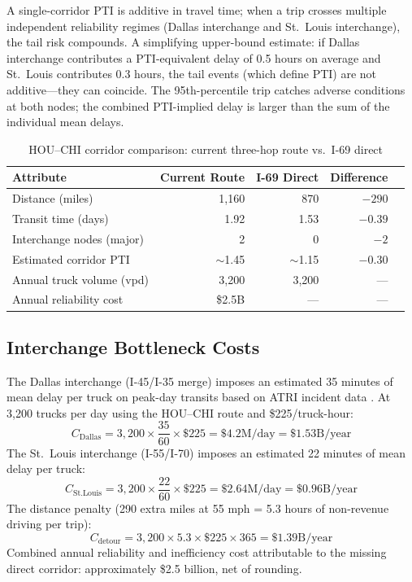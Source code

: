 A single-corridor PTI is additive in travel time; when a trip crosses multiple independent reliability regimes (Dallas interchange and St.\ Louis interchange), the tail risk compounds. A simplifying upper-bound estimate: if Dallas interchange contributes a PTI-equivalent delay of 0.5 hours on average and St.\ Louis contributes 0.3 hours, the tail events (which define PTI) are not additive---they can coincide. The 95th-percentile trip catches adverse conditions at both nodes; the combined PTI-implied delay is larger than the sum of the individual mean delays.

\begin{table}[ht]
\centering
\caption{HOU--CHI corridor comparison: current three-hop route vs.\ I-69 direct}
\label{tab:houchi_compare}
\begin{tabular}{lrrrr}
\toprule
Attribute & Current Route & I-69 Direct & Difference \\
\midrule
Distance (miles)          & 1,160 & 870  & $-290$ \\
Transit time (days)       & 1.92  & 1.53 & $-0.39$ \\
Interchange nodes (major) & 2     & 0    & $-2$ \\
Estimated corridor PTI    & $\sim$1.45 & $\sim$1.15 & $-0.30$ \\
Annual truck volume (vpd) & 3,200 & 3,200 & --- \\
Annual reliability cost   & \$2.5B & --- & --- \\
\bottomrule
\end{tabular}
\end{table}

\subsection{Interchange Bottleneck Costs}

The Dallas interchange (I-45/I-35 merge) imposes an estimated 35 minutes of mean delay per truck on peak-day transits based on ATRI incident data \citep{ATRI_costs2024}. At 3,200 trucks per day using the HOU--CHI route and \$225/truck-hour:
\begin{equation}
  C_{\text{Dallas}} = 3{,}200 \times \frac{35}{60} \times \$225 = \$4.2\text{M/day} = \$1.53\text{B/year}
\end{equation}
The St.\ Louis interchange (I-55/I-70) imposes an estimated 22 minutes of mean delay per truck:
\begin{equation}
  C_{\text{St.Louis}} = 3{,}200 \times \frac{22}{60} \times \$225 = \$2.64\text{M/day} = \$0.96\text{B/year}
\end{equation}
The distance penalty (290 extra miles at 55 mph = 5.3 hours of non-revenue driving per trip):
\begin{equation}
  C_{\text{detour}} = 3{,}200 \times 5.3 \times \$225 \times 365 = \$1.39\text{B/year}
\end{equation}
Combined annual reliability and inefficiency cost attributable to the missing direct corridor: approximately \$2.5 billion, net of rounding.

